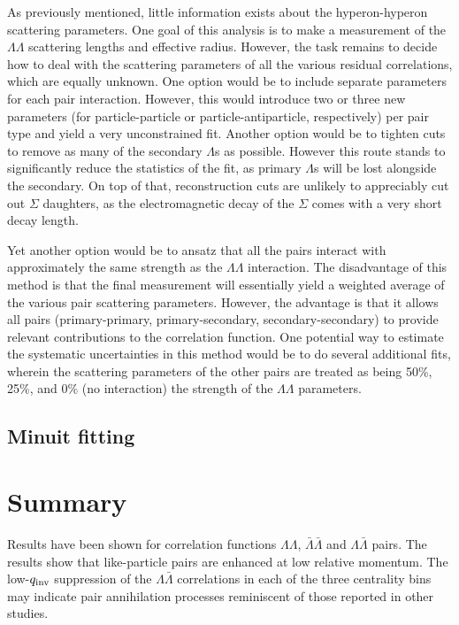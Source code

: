 As previously mentioned, little information exists about the hyperon-hyperon scattering parameters.  One goal of this analysis is to make a measurement of the $\Lambda\Lambda$ scattering lengths and effective radius.  However, the task remains to decide how to deal with the scattering parameters of all the various residual correlations, which are equally unknown.  One option would be to include separate parameters for each pair interaction.  However, this would introduce two or three new parameters (for particle-particle or particle-antiparticle, respectively) per pair type and yield a very unconstrained fit.  Another option would be to tighten cuts to remove as many of the secondary $\Lambda$s as possible.  However this route stands to significantly reduce the statistics of the fit, as primary $\Lambda$s will be lost alongside the secondary.  On top of that, reconstruction cuts are unlikely to appreciably cut out $\Sigma$ daughters, as the electromagnetic decay of the $\Sigma$ comes with a very short decay length.

Yet another option would be to ansatz that all the pairs interact with approximately the same strength as the $\Lambda\Lambda$ interaction.  The disadvantage of this method is that the final measurement will essentially yield a weighted average of the various pair scattering parameters.  However, the advantage is that it allows all pairs (primary-primary, primary-secondary, secondary-secondary) to provide relevant contributions to the correlation function.  One potential way to estimate the systematic uncertainties in this method would be to do several additional fits, wherein the scattering parameters of the other pairs are treated as being 50\%, 25\%, and 0\% (no interaction) the strength of the $\Lambda\Lambda$ parameters.

\subsection{Minuit fitting}
\label{sec:MinuitFit}


\section{Summary}
Results have been shown for correlation functions $\Lambda\Lambda$, $\bar{\Lambda}\bar{\Lambda}$ and $\Lambda\bar{\Lambda}$ pairs.  The results show that like-particle pairs are enhanced at low relative momentum.  The low-$q_{\rm inv}$ suppression of the $\Lambda\bar{\Lambda}$ correlations in each of the three centrality bins may indicate pair annihilation processes reminiscent of those reported in other studies.

